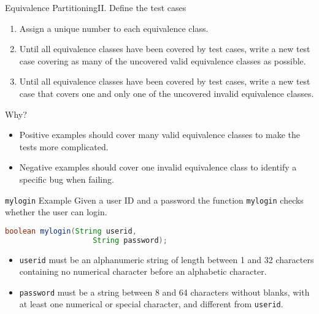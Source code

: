 \begin{Frame}{Equivalence Partitioning}{II. Define the test cases}
  \begin{enumerate}
    \item Assign a unique number to each equivalence class.
    \item Until all equivalence classes have been covered by test cases, write a new test case covering \alert{as many of the uncovered valid equivalence classes as possible}.
    \item Until all equivalence classes have been covered by test cases, write a new test case that covers \alert{one and only one of the uncovered invalid equivalence classes}.
    \end{enumerate}

    \xxx

    \begin{alertblock}{Why?}
      \pause
      \begin{itemize}
        \item Positive examples should \alert{cover many} valid equivalence classes to make the tests more complicated.
        \item Negative examples should \alert{cover one} invalid equivalence class to identify a specific bug when failing.
      \end{itemize}
    \end{alertblock}
\end{Frame}

\begin{Frame}[fragile]{\lstinline-mylogin- Example}
  Given a user ID and a password the function \lstinline-mylogin- checks whether the user can login.

  \begin{lstlisting}[language=Java,gobble=4]
    boolean mylogin(String userid,
                    String password);
  \end{lstlisting}

  \begin{itemize}
    \item \lstinline-userid- must be an alphanumeric string of length between 1 and 32 characters containing no numerical character before an alphabetic character.
    \item \lstinline-password- must be a string between 8 and 64 characters without blanks, with at least one numerical or special character, and different from \lstinline-userid-.
  \end{itemize}
\end{Frame}

